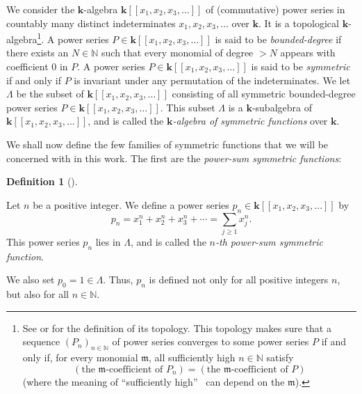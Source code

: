 \documentclass[numbers=enddot,12pt,final,onecolumn,notitlepage]{scrartcl}%
\theoremstyle{definition}
\newtheorem{defi}[theo]{Definition}
\newenvironment{definition}[1][]
{\begin{defi}[#1]\begin{leftbar}}
{\end{leftbar}\end{defi}}
\let\sumnonlimits\sum
\renewcommand{\sum}{\sumnonlimits\limits}
\begin{document}
We consider the $\mathbf{k}$-algebra $\mathbf{k}\left[  \left[  x_{1}%
,x_{2},x_{3},\ldots\right]  \right]  $ of (commutative) power series in
countably many distinct indeterminates $x_{1},x_{2},x_{3},\ldots$ over
$\mathbf{k}$. It is a topological $\mathbf{k}$-algebra\footnote{See
\cite[Section 2.6]{Reiner} or \cite[\S 2]{Grinbe16} for the definition of its
topology. This topology makes sure that a sequence $\left(  P_{n}\right)
_{n\in\mathbb{N}}$ of power series converges to some power series $P$ if and
only if, for every monomial $\mathfrak{m}$, all sufficiently high
$n\in\mathbb{N}$ satisfy%
\[
\left(  \text{the }\mathfrak{m}\text{-coefficient of }P_{n}\right)  =\left(
\text{the }\mathfrak{m}\text{-coefficient of }P\right)
\]
(where the meaning of \textquotedblleft sufficiently high\textquotedblright%
\ can depend on the $\mathfrak{m}$).}. A power series $P\in\mathbf{k}\left[
\left[  x_{1},x_{2},x_{3},\ldots\right]  \right]  $ is said to be
\emph{bounded-degree} if there exists an $N\in\mathbb{N}$ such that every
monomial of degree $>N$ appears with coefficient $0$ in $P$. A power series
$P\in\mathbf{k}\left[  \left[  x_{1},x_{2},x_{3},\ldots\right]  \right]  $ is
said to be \emph{symmetric} if and only if $P$ is invariant under any
permutation of the indeterminates. We let $\Lambda$ be the subset of
$\mathbf{k}\left[  \left[  x_{1},x_{2},x_{3},\ldots\right]  \right]  $
consisting of all symmetric bounded-degree power series $P\in\mathbf{k}\left[
\left[  x_{1},x_{2},x_{3},\ldots\right]  \right]  $. This subset $\Lambda$ is
a $\mathbf{k}$-subalgebra of $\mathbf{k}\left[  \left[  x_{1},x_{2}%
,x_{3},\ldots\right]  \right]  $, and is called the $\mathbf{k}$\emph{-algebra
of symmetric functions} over $\mathbf{k}$.

We shall now define the few families of symmetric functions that we will be
concerned with in this work. The first are the \emph{power-sum symmetric
functions}:

\begin{definition}
\label{def.powersum}Let $n$ be a positive integer. We define a power series
$p_{n}\in\mathbf{k}\left[  \left[  x_{1},x_{2},x_{3},\ldots\right]  \right]  $
by%
\begin{equation}
p_{n}=x_{1}^{n}+x_{2}^{n}+x_{3}^{n}+\cdots=\sum_{j\geq1}x_{j}^{n}.
\label{eq.def.powersum.pn}%
\end{equation}
This power series $p_{n}$ lies in $\Lambda$, and is called the $n$\emph{-th
power-sum symmetric function}.

We also set $p_{0}=1\in\Lambda$. Thus, $p_{n}$ is defined not only for all
positive integers $n$, but also for all $n\in\mathbb{N}$.
\end{definition}
\end{document}
